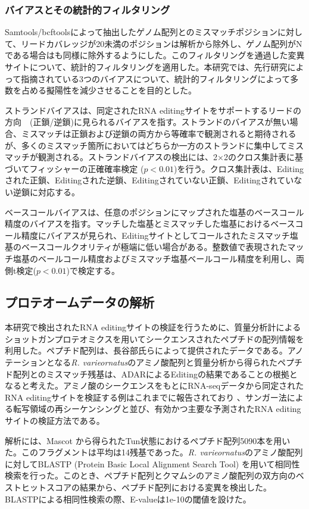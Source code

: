 \subsubsection{バイアスとその統計的フィルタリング}
Samtools/bcftoolsによって抽出したゲノム配列とのミスマッチポジションに対して、リードカバレッジが20未満のポジションは解析から除外し、ゲノム配列がNである場合はも同様に除外するようにした。このフィルタリングを通過した変異サイトについて、統計的フィルタリングを適用した。本研究では、先行研究によって指摘されている3つのバイアスについて、統計的フィルタリングによって多数を占める擬陽性を減少させることを目的とした。
\par
ストランドバイアスは、同定されたRNA editingサイトをサポートするリードの方向　(正鎖/逆鎖)に見られるバイアスを指す。ストランドのバイアスが無い場合、ミスマッチは正鎖および逆鎖の両方から等確率で観測されると期待されるが、多くのミスマッチ箇所においてはどちらか一方のストランドに集中してミスマッチが観測される。ストランドバイアスの検出には、2×2のクロス集計表に基づいてフィッシャーの正確確率検定 ($p<0.01$)を行う。クロス集計表は、Editingされた正鎖、Editingされた逆鎖、Editingされていない正鎖、Editingされていない逆鎖に対応する。
\par
ベースコールバイアスは、任意のポジションにマップされた塩基のベースコール精度のバイアスを指す。マッチした塩基とミスマッチした塩基におけるベースコール精度にバイアスが見られ、Editingサイトとしてコールされたミスマッチ塩基のベースコールクオリティが極端に低い場合がある。整数値で表現されたマッチ塩基のベールコール精度およびミスマッチ塩基ベールコール精度を利用し、両側t検定($p<0.01$)で検定する。

\subsection{プロテオームデータの解析}
本研究で検出されたRNA editingサイトの検証を行うために、質量分析計によるショットガンプロテオミクスを用いてシークエンスされたペプチドの配列情報を利用した。ペプチド配列は、長谷部氏らによって提供されたデータである。アノテーションとなる{\it R. varieornatus}のアミノ酸配列と質量分析から得られたペプチド配列とのミスマッチ残基は、ADARによるEditingの結果であることの根拠となると考えた。アミノ酸のシークエンスをもとにRNA-seqデータから同定されたRNA editingサイトを検証する例はこれまでに報告されており \citep{pmid21596952}、サンガー法による転写領域の再シーケンシングと並び、有効かつ主要な予測されたRNA editingサイトの検証方法である。
\par
解析には、Mascot \citep{pmid10612281}から得られたTun状態におけるペプチド配列5090本を用いた。このフラグメントは平均は14残基であった。{\it R. varieornatus}のアミノ酸配列に対してBLASTP (Protein Basic Local Alignment Search Tool) \citep{pmid9254694}を用いて相同性検索を行った。このとき、ペプチド配列とクマムシのアミノ酸配列の双方向のベストヒットスコアの結果から、ペプチド配列における変異を検出した。BLASTPによる相同性検索の際、E-valueは1e-10の閾値を設けた。

